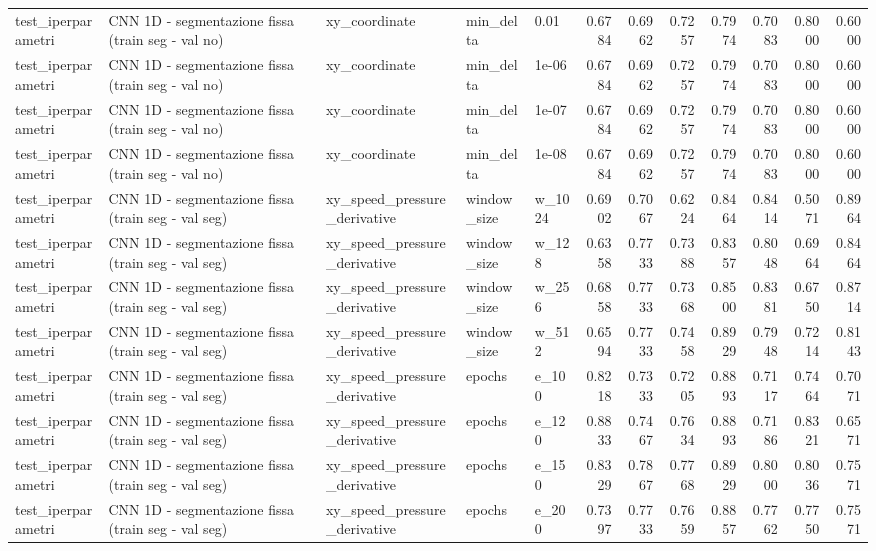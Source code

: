 \documentclass{article}
\begin{document}
\begin{table}[htbp]
\begin{adjustbox}{max width=\textwidth}
\begin{tabular}{lllllrrrrrrr}
test\_iperparametri & CNN 1D - segmentazione fissa (train seg - val no) & xy\_coordinate & min\_delta & 0.01 & 0.6784 & 0.6962 & 0.7257 & 0.7974 & 0.7083 & 0.8000 & 0.6000 \\
test\_iperparametri & CNN 1D - segmentazione fissa (train seg - val no) & xy\_coordinate & min\_delta & 1e-06 & 0.6784 & 0.6962 & 0.7257 & 0.7974 & 0.7083 & 0.8000 & 0.6000 \\
test\_iperparametri & CNN 1D - segmentazione fissa (train seg - val no) & xy\_coordinate & min\_delta & 1e-07 & 0.6784 & 0.6962 & 0.7257 & 0.7974 & 0.7083 & 0.8000 & 0.6000 \\
test\_iperparametri & CNN 1D - segmentazione fissa (train seg - val no) & xy\_coordinate & min\_delta & 1e-08 & 0.6784 & 0.6962 & 0.7257 & 0.7974 & 0.7083 & 0.8000 & 0.6000 \\
test\_iperparametri & CNN 1D - segmentazione fissa (train seg - val seg) & xy\_speed\_pressure\_derivative & window\_size & w\_1024 & 0.6902 & 0.7067 & 0.6224 & 0.8464 & 0.8414 & 0.5071 & 0.8964 \\
test\_iperparametri & CNN 1D - segmentazione fissa (train seg - val seg) & xy\_speed\_pressure\_derivative & window\_size & w\_128 & 0.6358 & 0.7733 & 0.7388 & 0.8357 & 0.8048 & 0.6964 & 0.8464 \\
test\_iperparametri & CNN 1D - segmentazione fissa (train seg - val seg) & xy\_speed\_pressure\_derivative & window\_size & w\_256 & 0.6858 & 0.7733 & 0.7368 & 0.8500 & 0.8381 & 0.6750 & 0.8714 \\
test\_iperparametri & CNN 1D - segmentazione fissa (train seg - val seg) & xy\_speed\_pressure\_derivative & window\_size & w\_512 & 0.6594 & 0.7733 & 0.7458 & 0.8929 & 0.7948 & 0.7214 & 0.8143 \\
test\_iperparametri & CNN 1D - segmentazione fissa (train seg - val seg) & xy\_speed\_pressure\_derivative & epochs & e\_100 & 0.8218 & 0.7333 & 0.7205 & 0.8893 & 0.7117 & 0.7464 & 0.7071 \\
test\_iperparametri & CNN 1D - segmentazione fissa (train seg - val seg) & xy\_speed\_pressure\_derivative & epochs & e\_120 & 0.8833 & 0.7467 & 0.7634 & 0.8893 & 0.7186 & 0.8321 & 0.6571 \\
test\_iperparametri & CNN 1D - segmentazione fissa (train seg - val seg) & xy\_speed\_pressure\_derivative & epochs & e\_150 & 0.8329 & 0.7867 & 0.7768 & 0.8929 & 0.8000 & 0.8036 & 0.7571 \\
test\_iperparametri & CNN 1D - segmentazione fissa (train seg - val seg) & xy\_speed\_pressure\_derivative & epochs & e\_200 & 0.7397 & 0.7733 & 0.7659 & 0.8857 & 0.7762 & 0.7750 & 0.7571 \\

\end{tabular}
\end{adjustbox}
\end{table}
\end{document}
